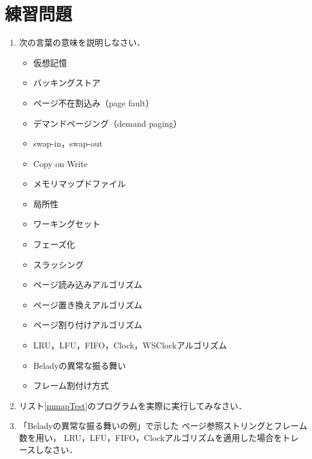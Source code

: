 \section*{練習問題}
\begin{enumerate}
  \renewcommand{\labelenumi}{\ttfamily\arabic{chapter}.\arabic{enumi}}
  \setlength{\leftskip}{1em}
\item 次の言葉の意味を説明しなさい．
  \begin{itemize}
  \item 仮想記憶
  \item バッキングストア
  \item ページ不在割込み（page fault）
  \item デマンドページング（demand paging）
  \item swap-in，swap-out
  \item Copy on Write
  \item メモリマップドファイル
  \item 局所性
  \item ワーキングセット
  \item フェーズ化
  \item スラッシング
  \item ページ読み込みアルゴリズム
  \item ページ置き換えアルゴリズム
  \item ページ割り付けアルゴリズム
  \item LRU，LFU，FIFO，Clock，WSClockアルゴリズム
  \item Beladyの異常な振る舞い
  \item フレーム割付け方式
  \end{itemize}
\item リスト\ref{mmapTest}のプログラムを実際に実行してみなさい．
\item 「Beladyの異常な振る舞いの例」で示した
  ページ参照ストリングとフレーム数を用い，
  LRU，LFU，FIFO，Clockアルゴリズムを適用した場合をトレースしなさい．
\end{enumerate}
